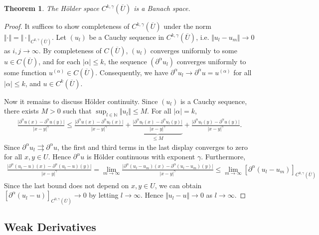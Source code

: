 \documentclass{article}
\numberwithin{equation}{section}
\newcommand{\bbN}{\mathbb{N}}
\newcommand{\ol}{\overline}
\theoremstyle{plain}
\newtheorem{theorem}{Theorem}[section]
\theoremstyle{definition}
\begin{document}
\begin{theorem}\label{thm:2.2}
The Hölder space $C^{k,\gamma}(\overline{U})$ is a Banach space.
\end{theorem}
\begin{proof}
It suffices to show completeness of $C^{k,\gamma}(\overline{U})$ under the norm $\Vert\cdot\Vert=\Vert\cdot\Vert_{C^{k,\gamma}(\overline{U})}$. Let $(u_l)$ be a Cauchy sequence in $C^{k,\gamma}(\overline{U})$, i.e. $\Vert u_l-u_m\Vert\to 0$ as $i,j\to\infty$. By completeness of $C(\ol{U})$, $(u_l)$ converges uniformly to some $u\in C(\ol{U})$, and for each $\vert\alpha\vert\leq k$, the sequence $(\partial^\alpha u_l)$ converges uniformly to some function $u^{(\alpha)}\in C(\ol{U})$. Consequently, we have $\partial^\alpha u_l\to \partial^\alpha u=u^{(\alpha)}$ for all $\vert\alpha\vert\leq k$, and $u\in C^k(\ol{U})$.

Now it remains to discuss Hölder continuity. Since $(u_l)$ is a Cauchy sequence, there exists $M>0$ such that $\sup_{l\in\bbN}\Vert u_l\Vert\leq M$. For all $\vert\alpha\vert=k$,
\begin{align*}
	\frac{\vert \partial^\alpha u(x)-\partial^\alpha u(y)\vert}{\vert x-y\vert^\gamma}\leq\frac{\vert \partial^\alpha u(x)-\partial^\alpha u_l(x)\vert}{\vert x-y\vert^\gamma}+\underbrace{\frac{\vert \partial^\alpha u_l(x)-\partial^\alpha u_l(y)\vert}{\vert x-y\vert^\gamma}}_{\leq M}+\frac{\vert \partial^\alpha u_l(y)-\partial^\alpha u(y)\vert}{\vert x-y\vert^\gamma}.
\end{align*}
Since $\partial^\alpha u_l\rightrightarrows \partial^\alpha u$, the first and third terms in the last display converges to zero for all $x,y\in U$. Hence $\partial^\alpha u$ is Hölder continuous with exponent $\gamma$. Furthermore,
\begin{align*}
	\frac{\vert \partial^\alpha(u_l-u)(x)-\partial^\alpha(u_l-u)(y)\vert}{\vert x-y\vert^\gamma}=\lim_{m\to\infty}\frac{\vert \partial^\alpha(u_l-u_m)(x)-\partial^\alpha(u_l-u_m)(y)\vert}{\vert x-y\vert^\gamma}\leq\lim_{m\to\infty}[\partial^\alpha(u_l-u_m)]_{C^{0,\gamma}(\ol{U})}
\end{align*}
Since the last bound does not depend on $x,y\in U$, we can obtain $[\partial^\alpha(u_l-u)]_{C^{0,\gamma}(\ol{U})}\to 0$ by letting $l\to\infty$. Hence $\Vert u_l-u\Vert\to 0$ as $l\to\infty$.
\end{proof}

\subsection{Weak Derivatives}
\end{document}
